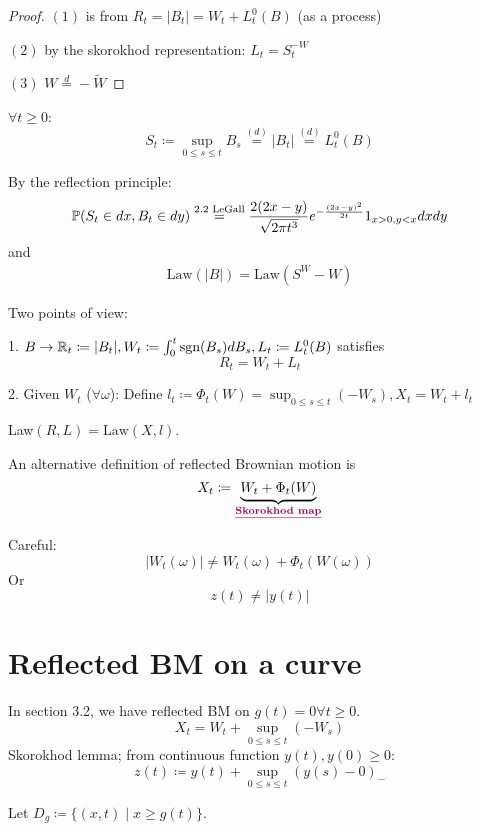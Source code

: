 \begin{proof}
    $(1)$ is from $R_t=|B_t|=W_t+L_t^{0}(B)$ (as a process)

    $(2)$ by the skorokhod representation: $L_t=S_t^{-W}$

    $(3)$ $W\stackrel{d}{=}-\tilde{W}$
\end{proof}

$\forall t\geq 0$:
\[S_t\coloneqq \sup_{0\leq s\leq t} B_s\stackrel{(d)}{=}|B_t|\stackrel{(d)}{=}L_t^0(B)\]

By the reflection principle:
\begin{align*}
    \mathbb{P}(S_t\in dx,B_t\in dy)\stackrel{2.2\text{ LeGall}}{=} \frac{2(2x-y)}{\sqrt{2\pi t^3}}e^{-\frac{(2x-y)^2}{2t}}1_{x>0,y<x}dxdy
\end{align*}
and 
\begin{align*}
    \text{Law}(|B|)=\text{Law}(S^W-W)
\end{align*}

Two points of view:

1. $B\to \mathbb{R}_t\coloneqq |B_t|,W_t\coloneqq\int_0^t\text{sgn}(B_s)dB_s,L_t\coloneqq L_t^0(B)$ satisfies\[R_t=W_t+L_t\]

2. Given $W_t$ ($\forall \omega$): Define $l_t\coloneqq\Phi_t(W)=\sup_{0\leq s\leq t} (-W_s),X_t=W_t+l_t$

Law$(R,L)=\text{Law}(X,l)$.

An alternative definition of reflected Brownian motion is \[X_t\coloneqq \underbrace{W_t+\Phi_t(W)}_{\text{\dhighlight{Skorokhod map}}}\]

\begin{aremark}
    Careful:
    \[|W_t(\omega)|\neq W_t(\omega)+\Phi_t(W(\omega))\]
    Or
    \[z(t)\neq |y(t)|\]
\end{aremark}

\section{Reflected BM on a curve}

In section 3.2, we have reflected BM on $g(t)=0\forall t\geq 0$.
\[X_t=W_t+\sup_{0\leq s\leq t}(-W_s)\]
Skorokhod lemma; from continuous function $y(t),y(0)\geq 0$:
\[z(t)\coloneqq y(t)+\sup_{0\leq s\leq t}(y(s)-0)_-\] 

Let $D_g\coloneqq \{(x,t) \mid x\geq g(t)\}$.

